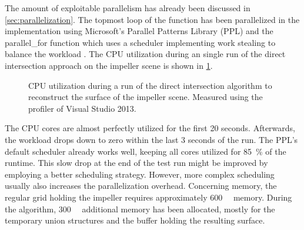 The amount of exploitable parallelism has already been discussed in \cref{sec:parallelization}.
The topmost loop of the  function has been parallelized in the implementation using Microsoft's Parallel Patterns Library (PPL) and the parallel\_for function which uses a scheduler implementing work stealing to balance the workload \cite{ppl_parallel_for}.
The CPU utilization during an single run of the direct intersection approach on the impeller scene is shown in \cref{fig:di_cpu}.
%
\begin{figure}[!]
	\centering
	\caption{
		CPU utilization during a run of the direct intersection algorithm to reconstruct the surface of the impeller scene.
		Measured using the profiler of Visual Studio 2013.
	}
	\label{fig:di_cpu}
\end{figure}
%
The CPU cores are almost perfectly utilized for the first 20 seconds.
Afterwards, the workload drops down to zero within the last 3 seconds of the run.
The PPL's default scheduler already works well, keeping all cores utilized for \SI{85}{\percent} of the runtime.
This slow drop at the end of the test run might be improved by employing a better scheduling strategy.
However, more complex scheduling usually also increases the parallelization overhead.
%
Concerning memory, the regular grid holding the impeller requires approximately \SI{600}{\mebi\byte} memory.
During the algorithm, \SI{300}{\mebi\byte} additional memory has been allocated, mostly for the temporary union structures and the buffer holding the resulting surface.

